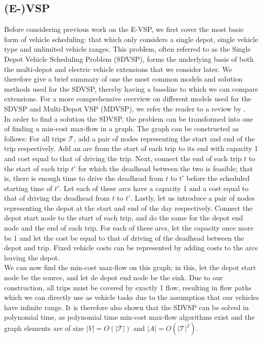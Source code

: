 \documentclass[]{article}
\begin{document}
\subsection{(E-)VSP}
Before considering previous work on the E-VSP, we first cover the most basic form of vehicle scheduling: that which only considers a single depot, single vehicle type and unlimited vehicle ranges. This problem, often referred to as the Single Depot Vehicle Scheduling Problem (SDVSP), forms the underlying basis of both the multi-depot and electric vehicle extensions that we consider later. We therefore give a brief summary of one the most common models and solution methods used for the SDVSP, thereby having a baseline to which we can compare extensions. For a more comprehensive overview on different models used for the SDVSP and Multi-Depot VSP (MDVSP), we refer the reader to a review by \citet{Bunte2009}. \\
In order to find a solution the SDVSP, the problem can be transformed into one of finding a min-cost max-flow in a graph. The graph can be constructed as follows: For all trips $\mathcal{T}$, add a pair of nodes representing the start and end of the trip respectively. Add an arc from the start of each trip to its end with capacity 1 and cost equal to that of driving the trip. Next, connect the end of each trip $t$ to the start of each trip $t'$ for which the deadhead between the two is feasible; that is, there is enough time to drive the deadhead from $t$ to $t'$ before the scheduled starting time of $t'$. Let each of these arcs have a capacity 1 and a cost equal to that of driving the deadhead from $t$ to $t'$. Lastly, let us introduce a pair of nodes representing the depot at the start and end of the day respectively. Connect the depot start node to the start of each trip, and do the same for the depot end node and the end of each trip. For each of these arcs, let the capacity once more be 1 and let the cost be equal to that of driving of the deadhead between the depot and trip. Fixed vehicle costs can be represented by adding costs to the arcs leaving the depot. \\
We can now find the min-cost max-flow on this graph; in this, let the depot start node be the source, and let de depot end node be the sink. Due to our construction, all trips must be covered by exactly 1 flow, resulting in flow paths which we can directly use as vehicle tasks due to the assumption that our vehicles have infinite range. It is therefore also shown that the SDVSP can be solved in polynomial time, as polynomial time min-cost max-flow algorithms exist and the graph elements are of size $|V| = O(|\mathcal{T}|)$ and $|A| = O(|\mathcal{T}|^2)$.\\ 
\end{document}
